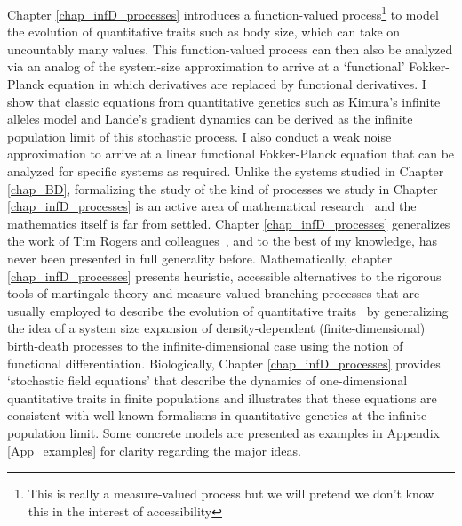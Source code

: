 Chapter \ref{chap_infD_processes} introduces a function-valued process\footnote{This is really a measure-valued process but we will pretend we don't know this in the interest of accessibility} to model the evolution of quantitative traits such as body size, which can take on uncountably many values. This function-valued process can then also be analyzed via an analog of the system-size approximation to arrive at a `functional' Fokker-Planck equation in which derivatives are replaced by functional derivatives. I show that classic equations from quantitative genetics such as Kimura's infinite alleles model and Lande's gradient dynamics can be derived as the infinite population limit of this stochastic process. I also conduct a weak noise approximation to arrive at a linear functional Fokker-Planck equation that can be analyzed for specific systems as required. Unlike the systems studied in Chapter \ref{chap_BD}, formalizing the study of the kind of processes we study in Chapter \ref{chap_infD_processes} is an active area of mathematical research~\citep{carmona_stochastic_1999,da_prato_stochastic_2014,prevot_concise_2007,liu_stochastic_2015,bogachev_fokker-planck-kolmogorov_2015,balan_gentle_2018} and the mathematics itself is far from settled. Chapter \ref{chap_infD_processes} generalizes the work of Tim Rogers and colleagues~\citep{rogers_demographic_2012,rogers_spontaneous_2012,rogers_modes_2015}, and to the best of my knowledge, has never been presented in full generality before. Mathematically, chapter \ref{chap_infD_processes} presents heuristic, accessible alternatives to the rigorous tools of martingale theory and measure-valued branching processes that are usually employed to describe the evolution of quantitative traits~\citep{champagnat_unifying_2006,etheridge_mathematical_2011, week_white_2021} by generalizing the idea of a system size expansion of density-dependent (finite-dimensional) birth-death processes to the infinite-dimensional case using the notion of functional differentiation. Biologically, Chapter \ref{chap_infD_processes} provides `stochastic field equations' that describe the dynamics of one-dimensional quantitative traits in finite populations and illustrates that these equations are consistent with well-known formalisms in quantitative genetics at the infinite population limit. Some concrete models are presented as examples in Appendix \ref{App_examples} for clarity regarding the major ideas.

